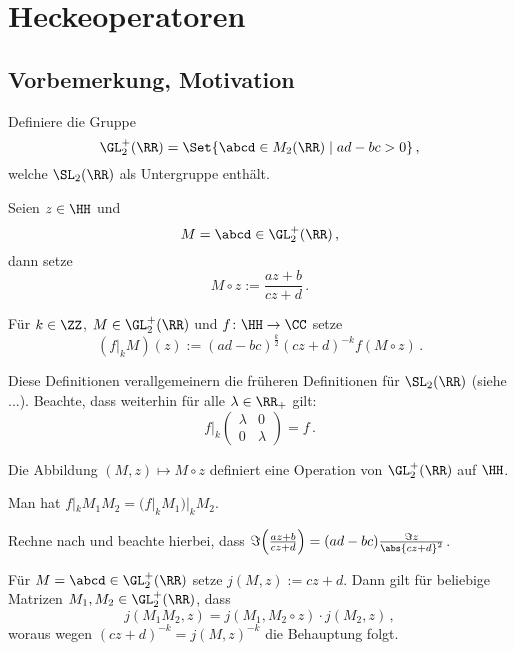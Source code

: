 \chapter{Heckeoperatoren}
\section{Vorbemerkung, Motivation}

\begin{defi}
Definiere die Gruppe
\[
\GL_2^+(\RR) = \Set{ \abcd \in M_2(\RR) \mid ad - bc > 0 }
\,,
\]
welche $\SL_2(\RR)$ als Untergruppe enthält.
\end{defi}

\begin{defi-list}
\item Seien $z \in \HH$ und 
\[
M = \abcd \in \GL_2^+(\RR)
\,,
\]
dann setze
\[
M \circ z := \frac{az+b}{cz+d}
\,.
\]
\item Für $k \in \ZZ$, $M \in \GL_2^+(\RR)$ und $f \colon \HH \to \CC$ setze
\[
(f |_k M)(z) := (ad - bc)^{\frac{k}{2}} (cz + d)^{-k} f \left( M \circ z \right)
\,.
\]
\end{defi-list}

Diese Definitionen verallgemeinern die früheren Definitionen für $\SL_2(\RR)$ (siehe ...). Beachte, dass weiterhin für alle $\lambda \in \RR_+$ gilt:
\[
f |_k 
\begin{pmatrix}
\lambda & 0\\
0 & \lambda
\end{pmatrix}
= f
\,.
\]

\begin{lemm-list} \label{lemm}
\item Die Abbildung $(M, z) \mapsto M \circ z$ definiert eine Operation von $\GL_2^+(\RR)$ auf $\HH$.
\item Man hat $f |_k M_1 M_2 = (f |_k M_1) |_k M_2$.
\end{lemm-list}

\begin{bewe-list}
\item Rechne nach und beachte hierbei, dass $\Im \Bigl( \frac{az+b}{cz+d} \Bigr) = (ad-bc) \frac{\Im z}{\abs{cz+d}^2}$.
\item Für $M = \abcd \in \GL_2^+(\RR)$ setze $j(M, z) := cz+d$. Dann gilt für beliebige Matrizen $M_1, M_2 \in \GL_2^+(\RR)$, dass
\[
j(M_1 M_2, z) = j(M_1, M_2 \circ z) \cdot j(M_2, z)
\,,
\]
woraus wegen $(cz+d)^{-k} = j(M, z)^{-k}$ die Behauptung folgt.
\end{bewe-list}

